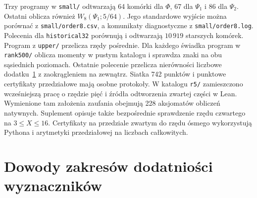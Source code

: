 \documentclass[11pt,a4paper,reqno]{amsart}
\numberwithin{equation}{section}
\begin{document}
Trzy programy w \texttt{small/} odtwarzają 64 komórki dla \(\Phi\), 67 dla \(\Psi_1\) i 86 dla \(\Psi_2\). Ostatni oblicza również \(W_8(\Psi_1;5/64)\). Jego standardowe wyjście można porównać z \texttt{small/order8.csv}, a komunikaty diagnostyczne z \texttt{small/order8.log}. Polecenia dla \texttt{historical32} porównują i odtwarzają \(10\,919\) starszych komórek. Program z \texttt{upper/} przelicza rzędy pośrednie. Dla każdego świadka program w \texttt{rank500/} oblicza momenty w pustym katalogu i sprawdza znaki na obu sąsiednich poziomach. Ostatnie polecenie przelicza nierówności liczbowe dodatku~\ref{sec:dproof} z zaokrągleniem na zewnątrz. Siatka 742 punktów i punktowe certyfikaty przedziałowe mają osobne protokoły. W katalogu \texttt{r5/} zamieszczono wcześniejszą pracę o rzędzie pięć i źródła odtworzenia zwartej części w Lean. Wymienione tam założenia zaufania obejmują 228 aksjomatów obliczeń natywnych. Suplement opisuje także bezpośrednie sprawdzenie rzędu czwartego na \(3\le X\le16\). Certyfikaty na przedziale zwartym do rzędu ósmego wykorzystują Pythona i arytmetyki przedziałowej na liczbach całkowitych.

\section{Dowody zakresów dodatniości wyznaczników}\label{sec:dproof}
\end{document}
